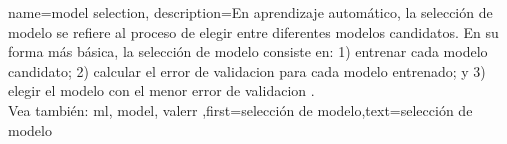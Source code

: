 {name={model selection},
	description={En aprendizaje automático, la selección de modelo se refiere al 
		proceso de elegir entre diferentes modelos candidatos. En su forma más  
		básica, la selección de modelo consiste en: 1) entrenar cada modelo candidato; 
		2) calcular el error de validacion para cada modelo entrenado; y 3) elegir el modelo
		con el menor error de validacion \cite[Ch. 6]{MLBasics}. 
		\\
		Vea también: \gls{ml}, \gls{model}, \gls{valerr} },first={selección de modelo},text={selección de modelo}  
}







